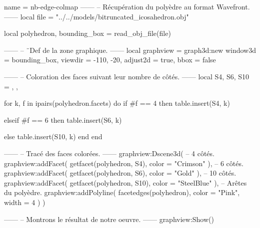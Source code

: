 \documentclass[border = 3pt]{standalone}
\begin{document}
\begin{luadraw*}{name = nb-edge-colmap}
------
-- Récupération du polyèdre au format Wavefront.
------
local file = "../../models/bitruncated_icosahedron.obj"

local polyhedron, bounding_box = read_obj_file(file)

------
-- ¨Def de la zone graphique.
------
local graphview = graph3d:new{
  window3d = bounding_box,
  viewdir  = {-110, -20},
  adjust2d = true,
  bbox     = false
}

------
-- Coloration des faces suivant leur nombre de côtés.
------
local S4, S6, S10 = {}, {}, {}

for k, f in ipairs(polyhedron.facets) do
  if #f == 4 then
    table.insert(S4, k)

  elseif #f == 6 then
    table.insert(S6, k)

  else
    table.insert(S10, k)
  end
end

------
-- Tracé des faces colorées.
------
graphview:Dscene3d(
-- 4 côtés.
  graphview:addFacet(
    getfacet(polyhedron, S4),
    {color = "Crimson"}
  ),
-- 6 côtés.
  graphview:addFacet(
    getfacet(polyhedron, S6),
    {color = "Gold"}
  ),
-- 10 côtés.
  graphview:addFacet(
    getfacet(polyhedron, S10),
    {color = "SteelBlue"}
  ),
-- Arêtes du polyèdre.
  graphview:addPolyline(
    facetedges(polyhedron),
    {
      color = "Pink",
      width = 4
    }
  )
)

------
-- Montrons le résultat de notre oeuvre.
------
graphview:Show()
\end{luadraw*}
\end{document}
